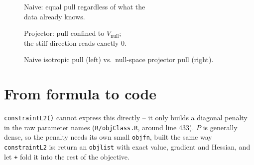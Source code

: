 \documentclass[11pt]{article}
\newcommand{\code}[1]{\texttt{#1}}
\newcommand{\file}[1]{\textcolor{black!60}{\texttt{#1}}}
\begin{document}
\begin{figure}[h]
\centering
\begin{minipage}{0.46\textwidth}
\centering
{}

\footnotesize Naive: equal pull regardless of what the\\data already knows.
\end{minipage}
\hfill
\begin{minipage}{0.46\textwidth}
\centering
{}

\footnotesize Projector: pull confined to $V_{\mathrm{null}}$;\\the stiff direction reads exactly $0$.
\end{minipage}
\caption{Naive isotropic pull (left) vs.\ null-space projector pull (right).}
\end{figure}

\section{From formula to code}

\code{constraintL2()} cannot express this directly -- it only builds a
diagonal penalty in the raw parameter names (\file{R/objClass.R}, around line
433). $P$ is generally dense, so the penalty needs its own small
\code{objfn}, built the same way \code{constraintL2} is: return an
\code{objlist} with exact value, gradient and Hessian, and let \code{+} fold
it into the rest of the objective.
\end{document}
